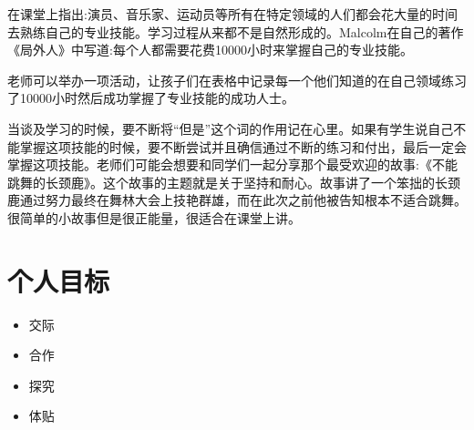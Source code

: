    \par
   在课堂上指出:演员、音乐家、运动员等所有在特定领域的人们都会花大量的时间去熟练自己的专业技能。学习过程从来都不是自然形成的。Malcolm在自己的著作《局外人》中写道:每个人都需要花费10000小时来掌握自己的专业技能。\par
   老师可以举办一项活动，让孩子们在表格中记录每一个他们知道的在自己领域练习了10000小时然后成功掌握了专业技能的成功人士。\par
   
   \begin{note}
     当谈及学习的时候，要不断将“但是”这个词的作用记在心里。如果有学生说自己不能掌握这项技能的时候，要不断尝试并且确信通过不断的练习和付出，最后一定会掌握这项技能。老师们可能会想要和同学们一起分享那个最受欢迎的故事:《不能跳舞的长颈鹿》。这个故事的主题就是关于坚持和耐心。故事讲了一个笨拙的长颈鹿通过努力最终在舞林大会上技艳群雄，而在此次之前他被告知根本不适合跳舞。很简单的小故事但是很正能量，很适合在课堂上讲。
   \end{note}  

\section{个人目标}
   \begin{itemize}
      \item 交际
      \item 合作
      \item 探究
      \item 体贴
   \end{itemize}  
